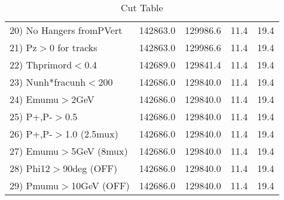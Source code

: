 \begin{table}[h!]
\begin{tabular}{||l||r|r|r|r||}
 20) No Hangers fromPVert &    142863.0 &    129986.6 &        11.4 &        19.4 \\
 21) Pz$>$0 for tracks    &    142863.0 &    129986.6 &        11.4 &        19.4 \\
 22) Thprimord$<$0.4      &    142689.0 &    129841.4 &        11.4 &        19.4 \\
 23) Nunh*fracunh$<$200   &    142686.0 &    129840.0 &        11.4 &        19.4 \\
 24) Emumu$>$2GeV         &    142686.0 &    129840.0 &        11.4 &        19.4 \\
 25) P+,P-$>$0.5          &    142686.0 &    129840.0 &        11.4 &        19.4 \\
 26) P+,P-$>$1.0 (2.5mux) &    142686.0 &    129840.0 &        11.4 &        19.4 \\
 27) Emumu$>$5GeV  (8mux) &    142686.0 &    129840.0 &        11.4 &        19.4 \\
 28) Phi12$>$90deg  (OFF) &    142686.0 &    129840.0 &        11.4 &        19.4 \\
 29) Pmumu$>$10GeV  (OFF) &    142686.0 &    129840.0 &        11.4 &        19.4 \\
 \hline
 \hline
 \end{tabular}
 \caption{Cut Table \cohjp  }
 \label{tab-cut__jpsi}
 \end{table}
